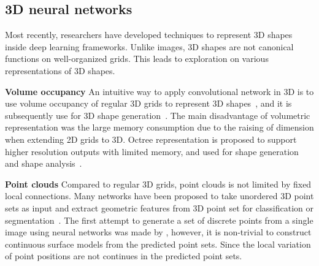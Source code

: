\subsection{3D neural networks}
Most recently, researchers have developed techniques to represent 3D shapes inside deep learning frameworks.%
Unlike images, 3D shapes are not canonical functions on well-organized grids. 
This leads to exploration on various representations of 3D shapes.

\noindent\textbf{Volume occupancy} 
An intuitive way to apply convolutional network in 3D is to use volume occupancy of regular 3D grids to represent 3D shapes~\cite{3dshapenet}, and it is subsequently use for 3D shape generation~\cite{3DR2N2,learnobj}.
%
The main disadvantage of volumetric representation was the large memory consumption due to the raising of dimension when extending 2D grids to 3D. 
Octree representation is proposed to support higher resolution outputs with limited memory, and used for shape generation~\cite{octreegen} and shape analysis~\cite{ocnn}.

\noindent\textbf{Point clouds} 
Compared to regular 3D grids, point clouds is not limited by fixed local connections.
Many networks have been proposed to take unordered 3D point sets as input and extract geometric features from 3D point set for classification or segmentation~\cite{PointNet,NIPS2017_7095,pointcnn}.
%
The first attempt to generate a set of discrete points from a single image using neural networks was made by \cite{PSGN}, however, it is non-trivial to construct continuous surface models from the predicted point sets. Since the local variation of point positions are not continues in the predicted point sets.
%

